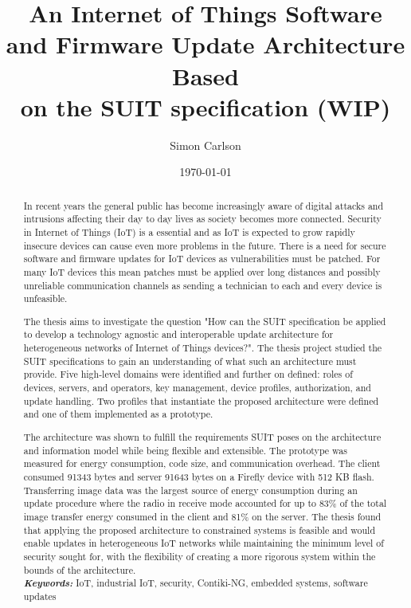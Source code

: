 \documentclass{kththesis}
\title{An Internet of Things Software and Firmware Update Architecture Based\\on the SUIT specification (WIP)}
\author{Simon Carlson}
\date{\today}
\providecommand{\keywords}[1]{\textbf{\textit{Keywords:}} #1}
\begin{document}
\frontmatter

\titlepage

\begin{abstract}
In recent years the general public has become increasingly aware of digital attacks and
intrusions affecting their day to day lives as society becomes more connected. Security in
Internet of Things (IoT) is a essential and as IoT is expected to grow rapidly insecure
devices can cause even more problems in the future. There is a need for secure software
and firmware updates for IoT devices as vulnerabilities must be patched. For many IoT
devices this mean patches must be applied over long distances and possibly unreliable
communication channels as sending a technician to each and every device is unfeasible. 

The thesis aims to investigate the question "How can the SUIT specification be applied to
develop a technology agnostic and interoperable update architecture for heterogeneous
networks of Internet of Things devices?". The thesis project studied the SUIT
specifications to gain an understanding of what such an architecture must provide. Five
high-level domains were identified and further on defined: roles of devices, servers, and
operators, key management, device profiles, authorization, and update handling. Two
profiles that instantiate the proposed architecture were defined and one of them
implemented as a prototype. 

The architecture was shown to fulfill the requirements SUIT poses on the architecture and
information model while being flexible and extensible. The prototype was measured for
energy consumption, code size, and communication overhead. The client consumed 91343 bytes
and server 91643 bytes on a Firefly device with 512 KB flash. Transferring image data was
the largest source of energy consumption during an update procedure where the radio in
receive mode accounted for up to 83\% of the total image transfer energy consumed in the
client and 81\% on the server. The thesis found that applying the proposed architecture to
constrained systems is feasible and would enable updates in heterogeneous IoT networks
while maintaining the minimum level of security sought for, with the flexibility of
creating a more rigorous system within the bounds of the architecture.\\

\noindent\keywords{IoT, industrial IoT, security, Contiki-NG, embedded systems, 
                    software updates}
\end{abstract}
\end{document}
